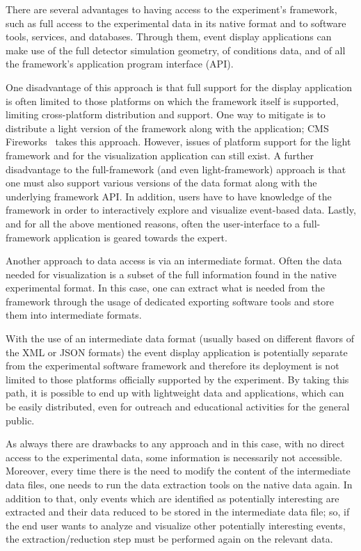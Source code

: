 \documentclass[12pt,a4paper]{article}
\begin{document}
There are several advantages to having access to the experiment's framework, such as full access to the experimental data in its native format and to software tools, services, and databases. Through them, event display applications can make use of the full detector simulation geometry, of conditions data, and of all the framework's application program interface (API).

One disadvantage of this approach is that full support for the display application is often limited to those platforms
on which the framework itself is supported, limiting cross-platform distribution and support.
One way to mitigate is to distribute a light version of the framework along with the application; CMS Fireworks~\cite{CMSFireworks}
takes this approach. However, issues of platform support for the light framework and for the visualization application can still exist.
A further disadvantage to the full-framework (and even light-framework) approach is that one must also support various versions of
the data format along with the underlying framework API. In addition, users have to have knowledge of the framework in order to interactively
explore and visualize event-based data. Lastly, and for all the above mentioned reasons, often the user-interface to a
full-framework application is geared towards the expert.

Another approach to data access is via an intermediate format. Often the data needed for visualization is a subset of the full information found in the native experimental format. In this case, one can extract what is needed from the framework through the usage of dedicated exporting software tools and store them
into intermediate formats.

With the use of an intermediate data format (usually based on different flavors of the XML or JSON formats) the event display application is potentially separate from the experimental software framework and therefore its deployment is not limited to those platforms officially supported by the experiment. By taking this path, it is possible to end up with lightweight data and applications, which can be easily distributed, even for outreach and educational activities for the general public. 

As always there are drawbacks to any approach and in this case, with no direct access to the experimental data, some information is necessarily not accessible. Moreover, every time there is the need to modify the content of the intermediate data files, one needs to run the data extraction tools on the native data again. In addition to that, only events which are identified as potentially interesting are extracted and their data reduced to be stored in the intermediate data file; so, if the end user wants to analyze and visualize other potentially interesting events, the extraction/reduction step must be performed again on the relevant data.
\end{document}
